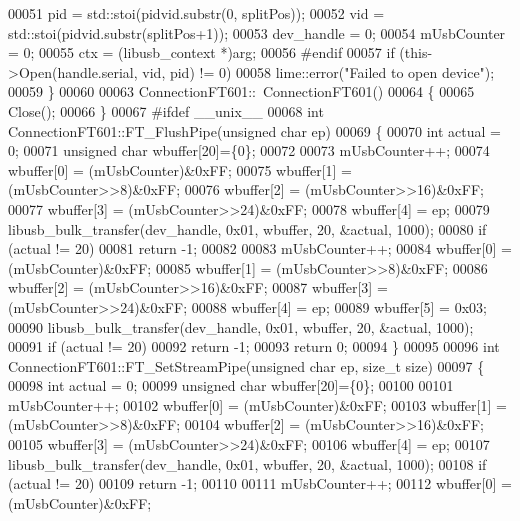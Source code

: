 \begin{DoxyCode}
00051     pid = std::stoi(pidvid.substr(0, splitPos));
00052     vid = std::stoi(pidvid.substr(splitPos+1));
00053     dev\_handle = 0;
00054     mUsbCounter = 0;
00055     ctx = (libusb\_context *)arg;
00056 \textcolor{preprocessor}{#endif}
00057     \textcolor{keywordflow}{if} (this->Open(handle.serial, vid, pid) != 0)
00058         lime::error(\textcolor{stringliteral}{"Failed to open device"});
00059 \}
00060 
00063 ConnectionFT601::~ConnectionFT601()
00064 \{
00065     Close();
00066 \}
00067 \textcolor{preprocessor}{#ifdef \_\_unix\_\_}
00068 \textcolor{keywordtype}{int} ConnectionFT601::FT\_FlushPipe(\textcolor{keywordtype}{unsigned} \textcolor{keywordtype}{char} ep)
00069 \{
00070     \textcolor{keywordtype}{int} actual = 0;
00071     \textcolor{keywordtype}{unsigned} \textcolor{keywordtype}{char} wbuffer[20]=\{0\};
00072 
00073     mUsbCounter++;
00074     wbuffer[0] = (mUsbCounter)&0xFF;
00075     wbuffer[1] = (mUsbCounter>>8)&0xFF;
00076     wbuffer[2] = (mUsbCounter>>16)&0xFF;
00077     wbuffer[3] = (mUsbCounter>>24)&0xFF;
00078     wbuffer[4] = ep;
00079     libusb\_bulk\_transfer(dev\_handle, 0x01, wbuffer, 20, &actual, 1000);
00080     \textcolor{keywordflow}{if} (actual != 20)
00081         \textcolor{keywordflow}{return} -1;
00082 
00083     mUsbCounter++;
00084     wbuffer[0] = (mUsbCounter)&0xFF;
00085     wbuffer[1] = (mUsbCounter>>8)&0xFF;
00086     wbuffer[2] = (mUsbCounter>>16)&0xFF;
00087     wbuffer[3] = (mUsbCounter>>24)&0xFF;
00088     wbuffer[4] = ep;
00089     wbuffer[5] = 0x03;
00090     libusb\_bulk\_transfer(dev\_handle, 0x01, wbuffer, 20, &actual, 1000);
00091     \textcolor{keywordflow}{if} (actual != 20)
00092         \textcolor{keywordflow}{return} -1;
00093     \textcolor{keywordflow}{return} 0;
00094 \}
00095 
00096 \textcolor{keywordtype}{int} ConnectionFT601::FT\_SetStreamPipe(\textcolor{keywordtype}{unsigned} \textcolor{keywordtype}{char} ep, \textcolor{keywordtype}{size\_t} size)
00097 \{
00098     \textcolor{keywordtype}{int} actual = 0;
00099     \textcolor{keywordtype}{unsigned} \textcolor{keywordtype}{char} wbuffer[20]=\{0\};
00100 
00101     mUsbCounter++;
00102     wbuffer[0] = (mUsbCounter)&0xFF;
00103     wbuffer[1] = (mUsbCounter>>8)&0xFF;
00104     wbuffer[2] = (mUsbCounter>>16)&0xFF;
00105     wbuffer[3] = (mUsbCounter>>24)&0xFF;
00106     wbuffer[4] = ep;
00107     libusb\_bulk\_transfer(dev\_handle, 0x01, wbuffer, 20, &actual, 1000);
00108     \textcolor{keywordflow}{if} (actual != 20)
00109         \textcolor{keywordflow}{return} -1;
00110 
00111     mUsbCounter++;
00112     wbuffer[0] = (mUsbCounter)&0xFF;

\end{DoxyCode}
